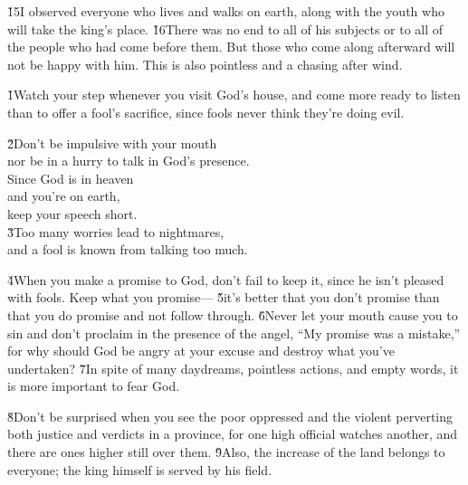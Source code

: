 \v{15}I observed everyone who lives and walks on earth, along with the youth who will take the king's place. \v{16}There was no end to all of his subjects or to all of the people who had come before them. But those who come along afterward will not be happy with him. This is also pointless and a chasing after wind.

\v{1}Watch your step whenever you visit God's house, and come more ready to listen than to offer a fool's sacrifice, since fools never think they're doing evil.

\begin{poetry}
\poeml \v{2}Don't be impulsive with your mouth \\
\poemll    nor be in a hurry to talk in God's presence. \\
\poeml Since God is in heaven \\
\poemll    and you're on earth, \\
\poemlll       keep your speech short. \\
\poeml \v{3}Too many worries lead to nightmares, \\
\poemll    and a fool is known from talking too much.
\end{poetry}

\v{4}When you make a promise to God, don't fail to keep it, since he isn't pleased with fools. Keep what you promise--- \v{5}it's better that you don't promise than that you do promise and not follow through. \v{6}Never let your mouth cause you to sin and don't proclaim in the presence of the angel, ``My promise was a mistake,'' for why should God be angry at your excuse and destroy what you've undertaken? \v{7}In spite of many daydreams, pointless actions, and empty words, it is more important to fear God.

\v{8}Don't be surprised when you see the poor oppressed and the violent perverting both justice and verdicts in a province, for one high official watches another, and there are ones higher still over them. \v{9}Also, the increase of the land belongs to everyone; the king himself is served by his field.

